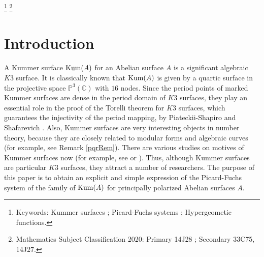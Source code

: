 \documentclass[10pt]{article}
\begin{document}
\maketitle
\setlength{\baselineskip}{13 pt}
 \renewcommand{\thefootnote}{\fnsymbol{footnote}}

\begin{abstract}
We determine a simple expression of the Picard-Fuchs system for a family of all Kummer surfaces for principally polarized Abelian surfaces.
It is given by a system of linear partial differential equations in three variables of rank five.
Our results are based on a Jacobian elliptic fibration on Kummer surfaces and a GKZ hypergeometric system suited to the elliptic fibration.
\end{abstract}



\footnote[0]{Keywords:  Kummer surfaces ; Picard-Fuchs systems  ;  Hypergeometic functions.  }
\footnote[0]{Mathematics Subject Classification 2020:  Primary 14J28 ; Secondary  33C75, 14J27.}



\section*{Introduction}

A Kummer surface ${\rm Kum} (A)$ for an Abelian surface $A$ is a significant algebraic $K3$ surface.
It is classically known that ${\rm Kum} (A)$  is given by a quartic surface in the projective space $\mathbb{P}^3(\mathbb{C})$ with $16$ nodes.
Since the period points of marked Kummer surfaces are dense in the period domain of $K3$ surfaces,
they play an essential role in the proof of the Torelli theorem for $K3$ surfaces, which guarantees the injectivity of the period mapping,  by  Piateckii-Shapiro and  Shafarevich \cite{PS}. 
Also, Kummer surfaces are very interesting objects in number theory,
because they are closely related to modular forms and algebraic curves 
(for example, see Remark \ref{pqrRem}). 
There are various studies on motives of Kummer surfaces now
(for example, see \cite{ILP} or \cite{S}).
Thus, although Kummer surfaces are particular $K3$ surfaces,
they attract a number of researchers.
The purpose of this paper is  to obtain an explicit and simple expression of the Picard-Fuchs system of the family of ${\rm Kum} (A)$ for principally polarized Abelian surfaces $A$.
\end{document}
